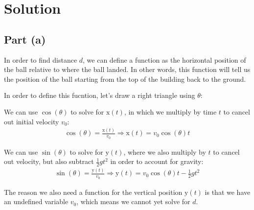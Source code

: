 \documentclass{article}
\newcommand{\x}{\mathrm{x}}
\newcommand{\y}{\mathrm{y}}
\begin{document}
\newpage
\section*{Solution}

\subsection*{Part (a)}
In order to find distance $d$, we can define a function as the
horizontal position of the ball relative to where the ball landed.
In other words, this function will tell us the position of the ball
starting from the top of the building back to the ground. 

In order to define this fucntion, let's draw a right triangle using $\theta$:
\begin{figure}[H]
    \centering
\end{figure}
We can use $\cos(\theta)$ to solve for $\x(t)$, 
in which we multiply by time $t$ to cancel out initial velocity $v_0$:
\begin{align}
    \cos(\theta)  = \frac{\x(t)}{v_0} \Rightarrow \boxed{\x(t) = v_0\cos(\theta)t}
\end{align}

We can use $\sin(\theta)$ to solve for $\y(t)$,
where we also multiply by $t$ to cancel out velocity, 
but also subtract $\frac{1}{2}gt^2$ in order to account 
for gravity:
\begin{align}
    \sin(\theta) = \frac{\y(t)}{v_0} \Rightarrow \boxed{\y(t) = v_0\cos(\theta)t - \frac{1}{2}gt^2}
\end{align}

The reason we also need a function for the vertical position $\y(t)$
is that we have an undefined variable $v_0$, which means we cannot yet 
solve for $d$.
\end{document}
